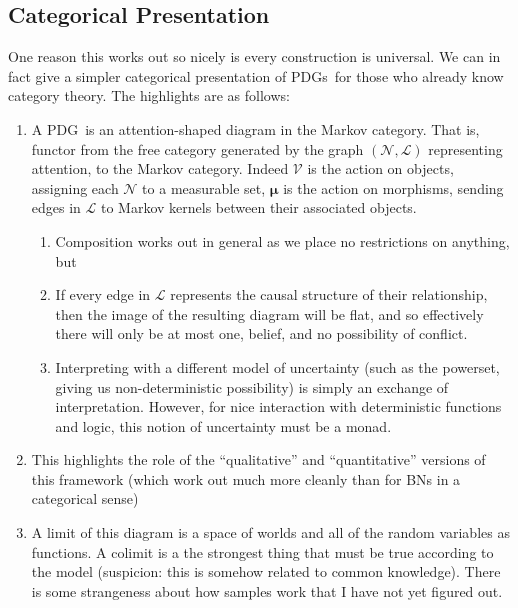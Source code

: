 \documentclass{article}
\newcommand{\MN}{PDG}
\newcommand{\MNs}{PDGs}
\newcommand\bmu{\boldsymbol{\mu}}
\begin{document}
	\begin{vcat}
		\subsection{Categorical Presentation}
		One reason this works out so nicely is every construction is universal. We can in fact give a simpler categorical presentation of \MNs\ for those who already know category theory. The highlights are as follows:
		\begin{enumerate}
			\item A \MN\ is an attention-shaped diagram in the Markov category. That is, functor from the free category generated by the graph $(\mathcal N, \mathcal L)$ representing attention, to the Markov category. Indeed $\mathcal V$ is the action on objects, assigning each $\mathcal N$ to a measurable set, $\bmu$ is the action on morphisms, sending edges in $\mathcal L$ to Markov kernels between their associated objects. 
			\begin{enumerate}
				\item Composition works out in general as we place no restrictions on anything, but
				\item If every edge in $\mathcal L$ represents the causal structure of their relationship, then the image of the resulting diagram will be flat, and so effectively there will only be at most one, belief, and no possibility of conflict.
				\item Interpreting with a different model of uncertainty (such as the powerset, giving us non-deterministic possibility) is simply an exchange of interpretation. However, for nice interaction with deterministic functions and logic, this notion of uncertainty must be a monad.
			\end{enumerate}
			
			\item This highlights the role of the ``qualitative'' and ``quantitative'' versions of this framework (which work out much more cleanly than for BNs in a categorical sense)
			
			\item A limit of this diagram is a space of worlds and all of the random variables as functions. A colimit is a the strongest thing that must be true according to the model (suspicion: this is somehow related to common knowledge). There is some strangeness about how samples work that I have not yet figured out.
		\end{enumerate}
	\end{vcat}
\end{document}
